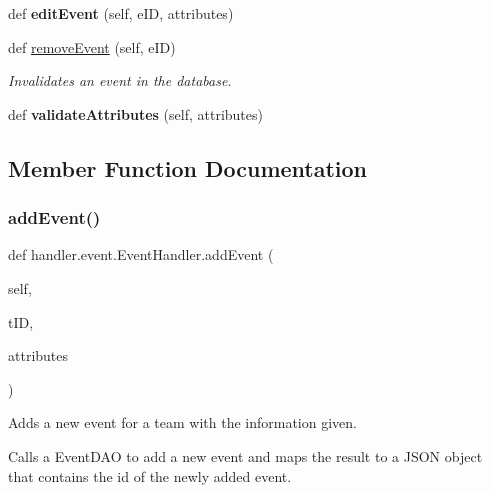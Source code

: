 \begin{DoxyCompactItemize}
\mbox{\label{classhandler_1_1event_1_1_event_handler_a80dc5621cd54f90b135642db51183d7c}} 
def {\bfseries edit\+Event} (self, e\+ID, attributes)
\item 
def \hyperlink{classhandler_1_1event_1_1_event_handler_a511281731fc33fae52d80e432680692d}{remove\+Event} (self, e\+ID)
\begin{DoxyCompactList}\small\item\em Invalidates an event in the database. \end{DoxyCompactList}\item 
\mbox{\label{classhandler_1_1event_1_1_event_handler_a75df7c2caab81a386ec89c6958070d35}} 
def {\bfseries validate\+Attributes} (self, attributes)
\end{DoxyCompactItemize}


\subsection{Member Function Documentation}
\mbox{\label{classhandler_1_1event_1_1_event_handler_a6c97fb08cd641f3d2dd07a6b5afc0a37}} 
\subsubsection{\texorpdfstring{add\+Event()}{addEvent()}}
{\footnotesize\ttfamily def handler.\+event.\+Event\+Handler.\+add\+Event (\begin{DoxyParamCaption}\item[{}]{self,  }\item[{}]{t\+ID,  }\item[{}]{attributes }\end{DoxyParamCaption})}



Adds a new event for a team with the information given. 

Calls a Event\+D\+AO to add a new event and maps the result to a J\+S\+ON object that contains the id of the newly added event.



